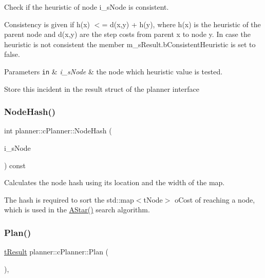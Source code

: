 Check if the heuristic of node i\+\_\+s\+Node is consistent. 

Consistency is given if h(x) $<$= d(x,y) + h(y), where h(x) is the heuristic of the parent node and d(x,y) are the step costs from parent x to node y. In case the heuristic is not consistent the member m\+\_\+s\+Result.\+b\+Consistent\+Heuristic is set to false. 
\begin{DoxyParams}[1]{Parameters}
\mbox{\tt in}  & {\em i\+\_\+s\+Node} & the node which heuristic value is tested. \\
\hline
\end{DoxyParams}
Store this incident in the result struct of the planner interface \mbox{\label{classplanner_1_1c_planner_a4c99873ce64b214899d65eda6366455f}} 
\subsubsection{\texorpdfstring{Node\+Hash()}{NodeHash()}}
{\footnotesize\ttfamily int planner\+::c\+Planner\+::\+Node\+Hash (\begin{DoxyParamCaption}\item[{std\+::shared\+\_\+ptr$<$ \mbox{\hyperlink{structplanner_1_1t_node}{t\+Node}} $>$ \&}]{i\+\_\+s\+Node }\end{DoxyParamCaption}) const}



Calculates the node hash using its location and the width of the map. 

The hash is required to sort the std\+::map$<$t\+Node$>$ o\+Cost of reaching a node, which is used in the \mbox{\hyperlink{classplanner_1_1c_planner_a341e70531266f023ac9461d18979d1ef}{A\+Star()}} search algorithm. \mbox{\label{classplanner_1_1c_planner_a21230c015260b9fc34ad2f239592470e}} 
\subsubsection{\texorpdfstring{Plan()}{Plan()}}
{\footnotesize\ttfamily \mbox{\hyperlink{structt_result}{t\+Result}} planner\+::c\+Planner\+::\+Plan (\begin{DoxyParamCaption}{ }\end{DoxyParamCaption})\hspace{0.3cm}{\ttfamily [override]}, {\ttfamily [virtual]}}



